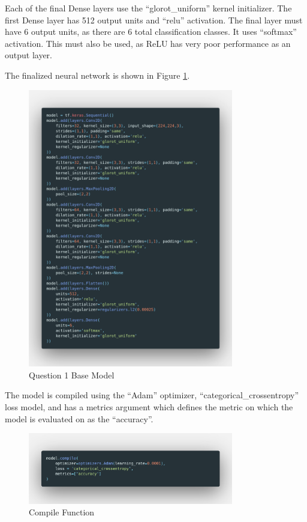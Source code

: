 Each of the final Dense layers use the ``glorot\_uniform'' kernel initializer.
The first Dense layer has 512 output units and ``relu'' activation. The final
layer must have 6 output units, as there are 6 total classification classes. It
uses ``softmax'' activation. This must also be used, as ReLU has very poor
performance as an output layer.

The finalized neural network is shown in Figure \ref{fig:q1Model}.

\begin{figure}[H]
	\centering
	\includegraphics[width=0.8\textwidth]{images/Code/model}
	\caption{Question 1 Base Model}
	\label{fig:q1Model}
\end{figure}

The model is compiled using the ``Adam'' optimizer,
``categorical\_crossentropy'' loss model, and has a metrics argument which
defines the metric on which the model is evaluated on as the ``accuracy''.

\begin{figure}[H]
	\centering
	\includegraphics[width=0.8\textwidth]{images/Code/compile}
	\caption{Compile Function}
	\label{fig:images-Code-compile}
\end{figure}

